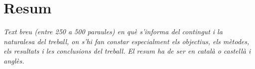 \chapter*{Resum}


\textit{Text breu (entre 250 a 500 paraules) en què s'informa del contingut i la naturalesa del treball, on s'hi fan constar especialment els objectius, els mètodes, els resultats i les conclusions del treball. El resum ha de ser en català o castellà i anglès.}